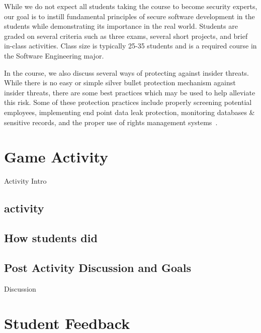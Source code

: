 \documentclass[conference]{IEEEtran}
\begin{document}
While we do not expect all students taking the course to become security experts, our goal is to instill fundamental principles of secure software development in the students while demonstrating its importance in the real world. Students are graded on several criteria such as three exams, several short projects, and brief in-class activities. Class size is typically 25-35 students and is a required course in the Software Engineering major.

In the course, we also discuss several ways of protecting against insider threats. While there is no easy or simple silver bullet protection mechanism against insider threats, there are some best practices which may be used to help alleviate this risk. Some of these protection practices include properly screening potential employees, implementing end point data leak protection, monitoring databases \& sensitive records, and the proper use of rights management systems~\cite{Insiderthreat_protection_url}.



\section{Game Activity} %
\label{sec: activity}

Activity Intro

\subsection{activity}



\subsection{How students did}



\subsection{Post Activity Discussion and Goals}

Discussion

\section{Student Feedback}
\label{sec: studentfeedback}
\end{document}
